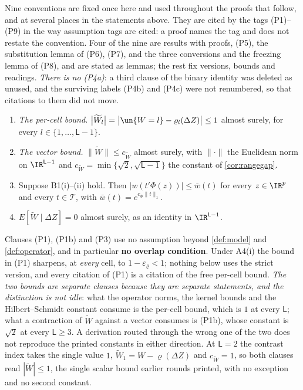Nine conventions are fixed once here and used throughout the proofs that follow, and at several
places in the statements above. They are cited by the tags \textup{(P1)}--\textup{(P9)} in the way
assumption tags are cited: a proof names the tag and does not restate the convention. Four of the nine
are results with proofs, \textup{(P5)}, the substitution lemma of \textup{(P6)}, \textup{(P7)}, and the
three conversions and the freezing lemma of \textup{(P8)}, and are stated as lemmas; the rest fix
versions, bounds and readings. \emph{There is no \textup{(P4a)}}: a third clause of the binary identity
was deleted as unused, and the surviving labels \textup{(P4b)} and \textup{(P4c)} were not renumbered, so
that citations to them did not move.

\begin{lemma}\label{lem:pbounds}
\begin{enumerate}
\item[\textup{(P1)}] \emph{The per-cell bound.}
$\big|\widetilde W_l\big|=\big|\un\{W=l\}-\varrho_l(\Delta Z)\big|\le1$ almost surely, for every
$l\in\{1,\dots,\mathsf L-1\}$.
\item[\textup{(P1b)}] \emph{The vector bound.} $\big\|\widetilde W\big\|\le c_{\widetilde W}$ almost
surely, with $\|\cdot\|$ the Euclidean norm on $\IR^{\mathsf L-1}$ and
$c_{\widetilde W}=\min\big\{\sqrt2,\sqrt{\mathsf L-1}\big\}$ the constant of \cref{cor:rangegap}.
\item[\textup{(P2)}] Suppose B1(i)--(ii) hold. Then $|w(t'\Phi(z))|\le\bar w(t)$ for every $z\in\IR^{p}$
and every $t\in\mathcal T$, with $\bar w(t)=e^{c_\Phi\|t\|_{1}}$.
\item[\textup{(P3)}] $E[\widetilde W\mid\Delta Z]=0$ almost surely, as an identity in $\IR^{\mathsf L-1}$.
\end{enumerate}
Clauses \textup{(P1)}, \textup{(P1b)} and \textup{(P3)} use no assumption beyond \cref{def:model}
and \cref{def:operator}, and in particular \textbf{no overlap condition}. Under A4(i) the bound in
\textup{(P1)} sharpens, at \emph{every} cell, to $1-\varepsilon_\varrho<1$; nothing below uses the strict
version, and every citation of \textup{(P1)} is a citation of the free per-cell bound.
\emph{The two bounds are separate clauses because they are separate statements, and the distinction is
not idle}: what the operator norms, the kernel bounds and the Hilbert--Schmidt constant consume is the
per-cell bound, which is $1$ at every $\mathsf L$; what a contraction of $\widetilde W$ against a vector
consumes is \textup{(P1b)}, whose constant is $\sqrt2$ at every $\mathsf L\ge3$. A derivation
routed through the wrong one of the two does not reproduce the printed constants in either direction.
At $\mathsf L=2$ the contrast index takes the single value $1$,
$\widetilde W_1=W-\varrho(\Delta Z)$ and $c_{\widetilde W}=1$, so both clauses read
$|\widetilde W|\le1$, the single scalar bound earlier rounds printed, with no exception and no second
constant.
\end{lemma}

